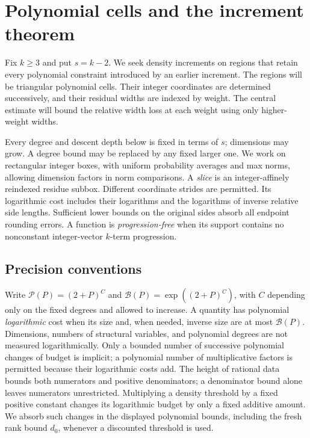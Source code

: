\section{Polynomial cells and the increment theorem}\label{ap:setup}

Fix $k\ge3$ and put $s=k-2$. We seek density increments on regions
that retain every polynomial constraint introduced by an earlier
increment. The regions will be triangular polynomial cells. Their
integer coordinates are determined successively, and their residual
widths are indexed by weight. The central estimate will bound the
relative width loss at each weight using only higher-weight widths.

Every degree and descent depth below is fixed in terms of $s$;
dimensions may grow. A degree bound may be replaced by any fixed
larger one. We work on rectangular integer boxes, with uniform
probability averages and max norms, allowing dimension factors in
norm comparisons. A \emph{slice} is an integer-affinely reindexed
residue subbox. Different coordinate strides are permitted. Its
logarithmic cost includes their logarithms and the logarithms of
inverse relative side lengths. Sufficient lower bounds on the
original sides absorb all endpoint rounding errors. A function is
\emph{progression-free} when its support contains no nonconstant
integer-vector $k$-term progression.

\subsection{Precision conventions}

Write $\mathcal P(P)=(2+P)^C$ and
$\mathcal B(P)=\exp((2+P)^C)$, with $C$ depending only on the fixed
degrees and allowed to increase. A quantity has polynomial
\emph{logarithmic} cost when its size and, when needed, inverse
size are at most $\mathcal B(P)$. Dimensions, numbers of structural
variables, and polynomial degrees are not measured logarithmically.
Only a bounded number of successive polynomial changes of budget
is implicit; a polynomial number of multiplicative factors is
permitted because their logarithmic costs add. The height of rational
data bounds both numerators and positive denominators; a denominator
bound alone leaves numerators unrestricted.
Multiplying a density threshold by a fixed positive constant changes
its logarithmic budget by only a fixed additive amount. We absorb
such changes in the displayed polynomial bounds, including the fresh
rank bound $d_0$, whenever a discounted threshold is used.

